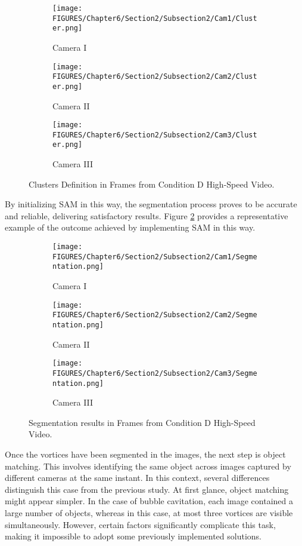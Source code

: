 \begin{figure}[htbp]
    \centering
    \begin{subfigure}{0.32\textwidth}
        \centering
        \texttt{[image: FIGURES/Chapter6/Section2/Subsection2/Cam1/Cluster.png]}
        \caption{Camera I}
    \end{subfigure}
    \begin{subfigure}{0.32\textwidth}
        \centering
        \texttt{[image: FIGURES/Chapter6/Section2/Subsection2/Cam2/Cluster.png]}
        \caption{Camera II}
    \end{subfigure}
    \begin{subfigure}{0.32\textwidth}
        \centering
        \texttt{[image: FIGURES/Chapter6/Section2/Subsection2/Cam3/Cluster.png]}
        \caption{Camera III}
    \end{subfigure}
    \caption{Clusters Definition in Frames from Condition D High-Speed Video.}
    \label{fig:Clustering}
\end{figure}

By initializing SAM in this way, the segmentation process proves to be accurate and reliable, delivering satisfactory results. Figure \ref{fig:Segmented} provides a representative example of the outcome achieved by implementing SAM in this way.

\begin{figure}[htbp]
    \centering
    \begin{subfigure}{0.32\textwidth}
        \centering
        \texttt{[image: FIGURES/Chapter6/Section2/Subsection2/Cam1/Segmentation.png]}
        \caption{Camera I}
    \end{subfigure}
    \begin{subfigure}{0.32\textwidth}
        \centering
        \texttt{[image: FIGURES/Chapter6/Section2/Subsection2/Cam2/Segmentation.png]}
        \caption{Camera II}
    \end{subfigure}
    \begin{subfigure}{0.32\textwidth}
        \centering
        \texttt{[image: FIGURES/Chapter6/Section2/Subsection2/Cam3/Segmentation.png]}
        \caption{Camera III}
    \end{subfigure}
    \caption{Segmentation results in Frames from Condition D High-Speed Video.}
    \label{fig:Segmented}
\end{figure}

Once the vortices have been segmented in the images, the next step is object matching. This involves identifying the same object across images captured by different cameras at the same instant.
In this context, several differences distinguish this case from the previous study. 
At first glance, object matching might appear simpler. In the case of bubble cavitation, each image contained a large number of objects, whereas in this case, at most three vortices are visible simultaneously.
However, certain factors significantly complicate this task, making it impossible to adopt some previously implemented solutions.

